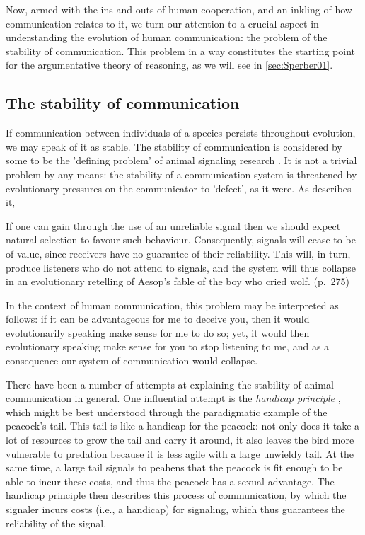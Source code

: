 Now, armed with the ins and outs of human cooperation, and an inkling of how communication relates to it, we turn our attention to a crucial aspect in understanding the evolution of human communication: the problem of the stability of communication.
This problem in a way constitutes the starting point for the argumentative theory of reasoning, as we will see in \cref{sec:Sperber01}.

\subsection{The stability of communication}
\label{sec:S-P08}

If communication between individuals of a species persists throughout evolution, we may speak of it as stable. The stability of communication is considered by some to be the 'defining problem' of animal signaling research \citep{Scott-Phillips08}. It is not a trivial problem by any means: the stability of a communication system is threatened by evolutionary pressures on the communicator to 'defect', as it were. As \citet{Scott-Phillips08} describes it,
\begin{quoting}
    If one can gain through the use of an unreliable signal then we should expect natural selection to favour such behaviour. Consequently, signals will cease to be of value, since receivers have no guarantee of their reliability. This will, in turn, produce listeners who do not attend to signals, and the system will thus collapse in an evolutionary retelling of Aesop’s fable of the boy who cried wolf.
    \hfill (p.~275)
\end{quoting}
In the context of human communication, this problem may be interpreted as follows: if it can be advantageous for me to deceive you, then it would evolutionarily speaking make sense for me to do so; yet, it would then evolutionary speaking make sense for you to stop listening to me, and as a consequence our system of communication would collapse.

There have been a number of attempts at explaining the stability of animal communication in general. One influential attempt is the \emph{handicap principle} \citep{Zahavi75, Zahavi99}, which might be best understood through the paradigmatic example of the peacock's tail.
This tail is like a handicap for the peacock: not only does it take a lot of resources to grow the tail and carry it around, it also leaves the bird more vulnerable to predation because it is less agile with a large unwieldy tail. At the same time, a large tail signals to peahens that the peacock is fit enough to be able to incur these costs, and thus the peacock has a sexual advantage.
The handicap principle then describes this process of communication, by which the signaler incurs costs (i.e., a handicap) for signaling, which thus guarantees the reliability of the signal.

